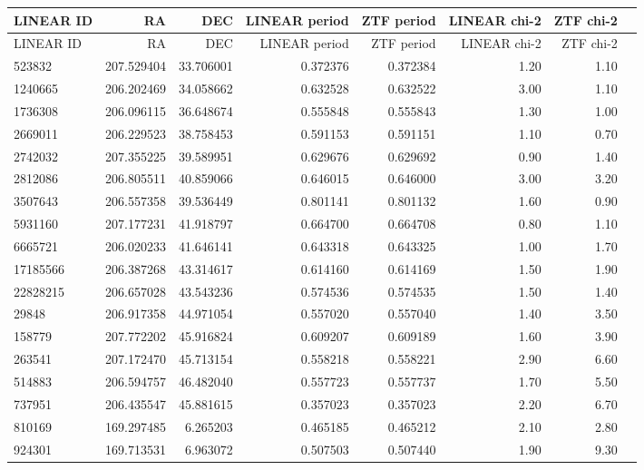 \begin{longtable}{lrrrrrrr}
    \toprule
    LINEAR ID & RA & DEC & LINEAR period & ZTF period & LINEAR chi-2 & ZTF chi-2 \\
        \midrule
    \endfirsthead
    
    \toprule
    LINEAR ID & RA & DEC & LINEAR period & ZTF period & LINEAR chi-2 & ZTF chi-2 \\
    \midrule
    \endhead
    
    \midrule
    \endfoot
    
    \bottomrule
    \endlastfoot
    
    523832 & 207.529404 & 33.706001 & 0.372376 & 0.372384 & 1.20 & 1.10 \\
1240665 & 206.202469 & 34.058662 & 0.632528 & 0.632522 & 3.00 & 1.10 \\
1736308 & 206.096115 & 36.648674 & 0.555848 & 0.555843 & 1.30 & 1.00 \\
2669011 & 206.229523 & 38.758453 & 0.591153 & 0.591151 & 1.10 & 0.70 \\
2742032 & 207.355225 & 39.589951 & 0.629676 & 0.629692 & 0.90 & 1.40 \\
2812086 & 206.805511 & 40.859066 & 0.646015 & 0.646000 & 3.00 & 3.20 \\
3507643 & 206.557358 & 39.536449 & 0.801141 & 0.801132 & 1.60 & 0.90 \\
5931160 & 207.177231 & 41.918797 & 0.664700 & 0.664708 & 0.80 & 1.10 \\
6665721 & 206.020233 & 41.646141 & 0.643318 & 0.643325 & 1.00 & 1.70 \\
17185566 & 206.387268 & 43.314617 & 0.614160 & 0.614169 & 1.50 & 1.90 \\
22828215 & 206.657028 & 43.543236 & 0.574536 & 0.574535 & 1.50 & 1.40 \\
29848 & 206.917358 & 44.971054 & 0.557020 & 0.557040 & 1.40 & 3.50 \\
158779 & 207.772202 & 45.916824 & 0.609207 & 0.609189 & 1.60 & 3.90 \\
263541 & 207.172470 & 45.713154 & 0.558218 & 0.558221 & 2.90 & 6.60 \\
514883 & 206.594757 & 46.482040 & 0.557723 & 0.557737 & 1.70 & 5.50 \\
737951 & 206.435547 & 45.881615 & 0.357023 & 0.357023 & 2.20 & 6.70 \\
810169 & 169.297485 & 6.265203 & 0.465185 & 0.465212 & 2.10 & 2.80 \\
924301 & 169.713531 & 6.963072 & 0.507503 & 0.507440 & 1.90 & 9.30 \\

\end{longtable}
